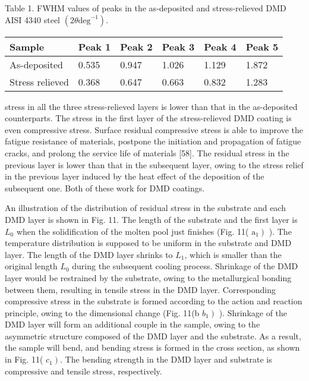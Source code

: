\documentclass[10pt]{article}
\begin{document}
Table 1. FWHM values of peaks in the as-deposited and stress-relieved DMD AISI 4340 steel $\left(2 \theta \mathrm{deg}^{-1}\right)$.

\begin{center}
\begin{tabular}{llllll}
\hline
Sample & Peak 1 & Peak 2 & Peak 3 & Peak 4 & Peak 5 \\
\hline
As-deposited & 0.535 & 0.947 & 1.026 & 1.129 & 1.872 \\
Stress relieved & 0.368 & 0.647 & 0.663 & 0.832 & 1.283 \\
\hline
\end{tabular}
\end{center}

stress in all the three stress-relieved layers is lower than that in the as-deposited counterparts. The stress in the first layer of the stress-relieved DMD coating is even compressive stress. Surface residual compressive stress is able to improve the fatigue resistance of materials, postpone the initiation and propagation of fatigue cracks, and prolong the service life of materials [58]. The residual stress in the previous layer is lower than that in the subsequent layer, owing to the stress relief in the previous layer induced by the heat effect of the deposition of the subsequent one. Both of these work for DMD coatings.

An illustration of the distribution of residual stress in the substrate and each DMD layer is shown in Fig. 11. The length of the substrate and the first layer is $L_{0}$ when the solidification of the molten pool just finishes (Fig. 11( $\left.\mathrm{a}_{1}\right)$ ). The temperature distribution is supposed to be uniform in the substrate and DMD layer. The length of the DMD layer shrinks to $L_{1}$, which is smaller than the original length $L_{0}$ during the subsequent cooling process. Shrinkage of the DMD layer would be restrained by the substrate, owing to the metallurgical bonding between them, resulting in tensile stress in the DMD layer. Corresponding compressive stress in the substrate is formed according to the action and reaction principle, owing to the dimensional change (Fig. 11(b $\left.b_{1}\right)$ ). Shrinkage of the DMD layer will form an additional couple in the sample, owing to the asymmetric structure composed of the DMD layer and the substrate. As a result, the sample will bend, and bending stress is formed in the cross section, as shown in Fig. 11( $\left.c_{1}\right)$. The bending strength in the DMD layer and substrate is compressive and tensile stress, respectively.
\end{document}
